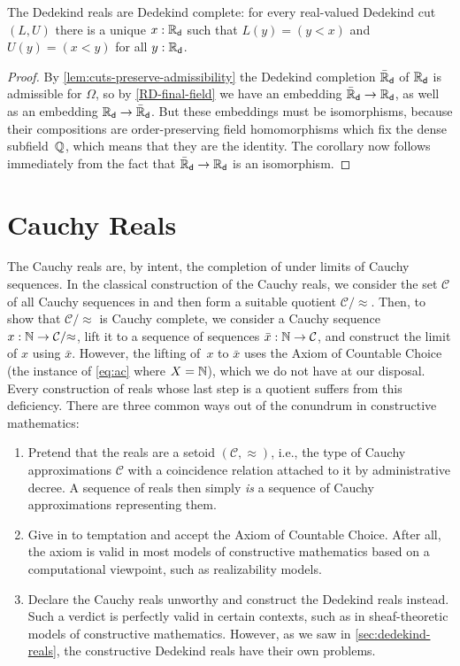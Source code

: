 \begin{cor} \label{RD-dedekind-complete}
  The Dedekind reals are Dedekind complete: for every real-valued Dedekind cut $(L, U)$
  there is a unique $x : \mathbb{R}_\mathsf{d}$ such that $L(y) = (y < x)$ and $U(y) = (x < y)$ for all $y :
  \mathbb{R}_\mathsf{d}$.
\end{cor}

\begin{proof}
  By \autoref{lem:cuts-preserve-admissibility} the Dedekind completion $\bar{\mathbb{R}}_\mathsf{d}$ of $\mathbb{R}_\mathsf{d}$
  is admissible for $\Omega$, so by \autoref{RD-final-field} we have an embedding $\bar{\mathbb{R}}_\mathsf{d}
  \to \mathbb{R}_\mathsf{d}$, as well as an embedding $\mathbb{R}_\mathsf{d} \to \bar{\mathbb{R}}_\mathsf{d}$. But these embeddings must be
  isomorphisms, because their compositions are order-preserving field homomorphisms which
  fix the dense subfield~$\mathbb{Q}$, which means that they are the identity. The corollary now
  follows immediately from the fact that $\bar{\mathbb{R}}_\mathsf{d} \to \mathbb{R}_\mathsf{d}$ is an isomorphism.
\end{proof}

\section{Cauchy Reals}
\label{sec:cauchy-reals}

The Cauchy reals are, by intent, the completion of \Q under limits of Cauchy sequences.
In the classical construction of the Cauchy reals, we consider the set $\mathcal{C}$ of all Cauchy sequences in \Q and then form a suitable quotient $\mathcal{C}/{\approx}$.
Then, to show that $\mathcal{C}/{\approx}$ is Cauchy complete, we consider a Cauchy sequence $x : \mathbb{N} \to \mathcal{C}/{\approx}$, lift it to a sequence of sequences $\bar{x} : \mathbb{N} \to \mathcal{C}$, and construct the limit of $x$ using $\bar{x}$. However, the lifting of~$x$ to $\bar{x}$ uses
the Axiom of Countable Choice (the instance of \autoref{eq:ac} where $X=\mathbb{N}$), which we do not have at our disposal.
Every construction of reals whose last step is a quotient suffers from this deficiency.
There are three common ways out of the conundrum in constructive mathematics:
%
\begin{enumerate}
\item Pretend that the reals are a setoid $(\mathcal{C}, {\approx})$, i.e., the type of
  Cauchy approximations $\mathcal{C}$ with a coincidence relation attached to it by
  administrative decree. A sequence of reals then simply \emph{is} a sequence of Cauchy
  approximations representing them.
\item Give in to temptation and accept the Axiom of Countable Choice. After all, the axiom
  is valid in most models of constructive mathematics based on a computational viewpoint,
  such as realizability models.
\item Declare the Cauchy reals unworthy and construct the Dedekind reals instead.
  Such a verdict is perfectly valid in certain contexts, such as in sheaf-theoretic models of constructive mathematics.
  However, as we saw in \autoref{sec:dedekind-reals}, the constructive Dedekind reals have their own problems.
\end{enumerate}

